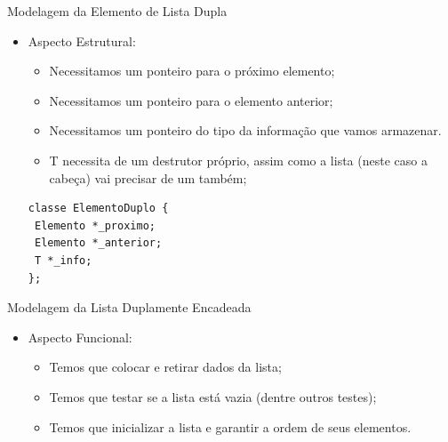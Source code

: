 \documentclass[12pt,table,xcolor={dvipsnames}]{beamer}
\begin{document}
\begin{frame}[fragile]{Modelagem da Elemento de Lista Dupla}

\begin{itemize}
\item Aspecto Estrutural:
\begin{itemize}
\item Necessitamos um ponteiro para o próximo elemento;
\item Necessitamos um ponteiro para o elemento anterior;
\item Necessitamos um ponteiro do tipo da informação que vamos armazenar.
\item T necessita de um destrutor próprio, assim como a lista (neste caso a cabeça) vai precisar de um também;
\end{itemize}
\begin{lstlisting}
classe ElementoDuplo {
 Elemento *_proximo;
 Elemento *_anterior;
 T *_info;
};
\end{lstlisting}
\end{itemize}
\end{frame}

\begin{frame}[fragile]{Modelagem da Lista Duplamente Encadeada}

\begin{itemize}
\item Aspecto Funcional:
\begin{itemize}
\item Temos que colocar e retirar dados da lista;
\item Temos que testar se a lista está vazia (dentre outros testes);
\item Temos que inicializar a lista e garantir a ordem de seus elementos.
\end{itemize}
\end{itemize}
\end{frame}
\end{document}
